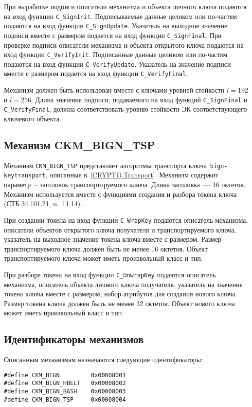 При выработке подписи описатели механизма и объекта
личного ключа подаются на вход функции \verb|C_SignInit|.
Подписываемые данные целиком или по-частям подаются
на вход функции \verb|C_SignUpdate|.
Указатель на выходное значение подписи вместе с размером
подается на вход функции \verb|C_SignFinal|.
При проверке подписи описатели механизма и объекта
открытого ключа подаются на вход функции \verb|C_VerifyInit|.
Подписанные данные целиком или по-частям подаются
на вход функции \verb|C_VerifyUpdate|.
Указатель на значение подписи вместе с размером
подается на вход функции \verb|C_VerifyFinal|.

Механизм должен быть использован вместе с ключами 
уровней стойкости $l=192$ и $l=256$.
Длина значения подписи, подаваемого на вход функций
\verb|C_SignFinal| и \verb|C_VerifyFinal|, должна соответствовать
уровню стойкости ЭК соответствующего ключевого объекта.

\subsection{Механизм CKM\_BIGN\_TSP} %
Механизм
\verb|CKM_BIGN_TSP| представляет алгоритмы транспорта 
ключа~\texttt{bign-keytransport}, описанные в~\ref{CRYPTO.Transport}.
Механизм содержит параметр~--
заголовок транспортируемого ключа. Длина заголовка~--- 16 октетов.
Механизм используется вместе с функциями создания и
разбора токена ключа (СТБ 34.101.21, п.~11.14).

При создании токена на вход функции \verb|C_WrapKey| подаются
описатель механизма, описатели объектов открытого ключа
получателя и транспортируемого ключа, указатель на
выходное значение токена ключа вместе с размером.
Размер транспортируемого ключа должен быть не менее 16 октетов.
Объект транспортируемого ключа может иметь произвольный класс и тип. 

При разборе токена на вход функции \verb|C_UnwrapKey| подаются
описатель механизма, описатель объекта личного ключа
получателя, указатель на значение токена ключа вместе с размером,
набор атрибутов для создания нового ключа.
Размер токена ключа должен быть не менее 32 октетов.
Объект нового ключа может иметь произвольный класс и тип.

\subsection{Идентификаторы механизмов}

Описанным механизмам назначаются следующие идентификаторы:
\begin{verbatim}
#define CKM_BIGN         0x00008001
#define CKM_BIGN_HBELT   0x00008002
#define CKM_BIGN_BASH    0x00008003
#define CKM_BIGN_TSP     0x00008004
\end{verbatim}


